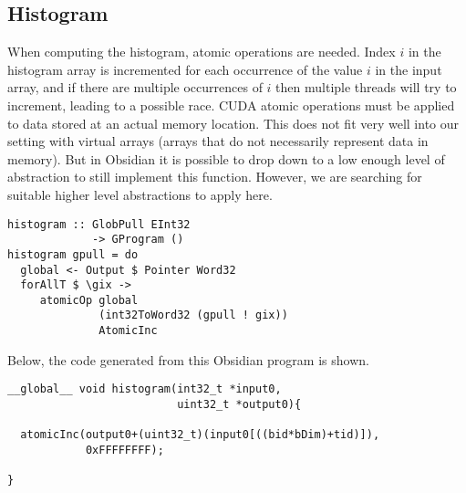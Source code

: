 \subsection{Histogram} 

When computing the histogram, atomic operations are needed. Index $i$
in the histogram array is incremented for each occurrence of the value
$i$ in the input array, and if there are multiple occurrences of $i$
then multiple threads will try to increment, leading to a possible race.
CUDA atomic operations must be applied to data stored at an actual memory 
location. This does not fit very well into our setting with virtual arrays 
(arrays that do not necessarily represent data in memory). But in Obsidian 
it is possible to drop down to a low enough level of abstraction to still 
implement this function. However, we are searching for suitable higher level 
abstractions to apply here.


\begin{small} 
\begin{Verbatim}[samepage=true] 
histogram :: GlobPull EInt32 
             -> GProgram ()
histogram gpull = do
  global <- Output $ Pointer Word32 
  forAllT $ \gix -> 
     atomicOp global 
              (int32ToWord32 (gpull ! gix)) 
              AtomicInc
\end{Verbatim} 
\end{small} 

Below, the code generated from this Obsidian program is shown.

\begin{small}
\begin{Verbatim}[samepage=true] 
__global__ void histogram(int32_t *input0,
                          uint32_t *output0){
  
  atomicInc(output0+(uint32_t)(input0[((bid*bDim)+tid)]),
            0xFFFFFFFF);
  
}
\end{Verbatim}
\end{small}


